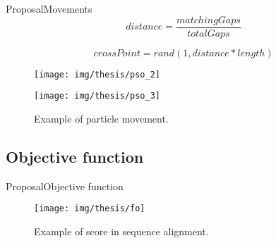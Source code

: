 \documentclass[10pt]{beamer}
\newcommand{\1}{
        	\setbeamertemplate{background}{
        		\texttt{[image: img/1]}
        		\tikz[overlay] \fill[fill opacity=0.75,fill=white] (0,0) rectangle (-\paperwidth,\paperheight);
        	}
}
\begin{document}
\begin{frame}{Proposal}{Movements}
	\begin{equation}\label{eq:distance}
	distance =  \dfrac{ matchingGaps }{totalGaps} 
	\end{equation}
	
	\begin{equation}\label{eq:crosspoint}
	crossPoint =  rand( 1, distance*length )
	\end{equation}
	
	\begin{figure}[h]
		\centering
		\begin{multicols}{2}
			\texttt{[image: img/thesis/pso\_2]}\par 
			\texttt{[image: img/thesis/pso\_3]}\par 
		\end{multicols}
		\caption{Example of particle movement.}
		\label{fig:s8_align}
	\end{figure}
\end{frame}

\subsection{Objective function}

\begin{frame}{Proposal}{Objective function}
	
	\begin{figure}[]
		\centering
		\texttt{[image: img/thesis/fo]}
		\label{img:alig}
		\caption{Example of score in sequence alignment.}
	\end{figure}	
	
\end{frame}
\end{document}
